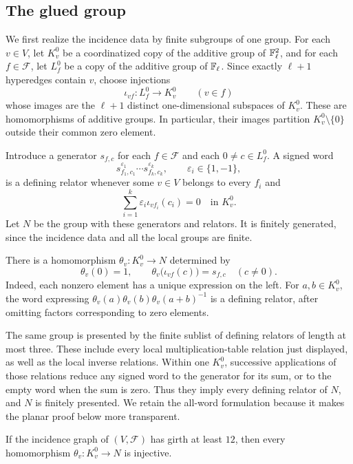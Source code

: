 \subsection{The glued group}

We first realize the incidence data by finite subgroups of one group.
For each $v\in V$, let $K_v^0$ be a coordinatized copy of the additive
group of $\mathbb F_\ell^2$, and for each $f\in\mathcal F$, let $L_f^0$ be a
copy of the additive group of $\mathbb F_\ell$.  Since exactly $\ell+1$
hyperedges contain $v$, choose injections
\[
  \iota_{vf}:L_f^0\longrightarrow K_v^0\qquad(v\in f)
\]
whose images are the $\ell+1$ distinct one-dimensional subspaces of
$K_v^0$.  These are homomorphisms of additive groups.  In particular,
their images partition $K_v^0\setminus\{0\}$ outside their common
zero element.

Introduce a generator $s_{f,c}$ for each $f\in\mathcal F$ and each
$0\ne c\in L_f^0$.  A signed word
\[
  s_{f_1,c_1}^{\varepsilon_1}\cdots
  s_{f_k,c_k}^{\varepsilon_k},\qquad \varepsilon_i\in\{1,-1\},
\]
is a defining relator whenever some $v\in V$ belongs to every $f_i$
and
\[
  \sum_{i=1}^k\varepsilon_i\iota_{vf_i}(c_i)=0
  \quad\text{in }K_v^0.
\]
Let $N$ be the group with these generators and relators.  It is
finitely generated, since the incidence data and all the local groups
are finite.

There is a homomorphism $\theta_v:K_v^0\to N$ determined by
\[
  \theta_v(0)=1,\qquad
  \theta_v\bigl(\iota_{vf}(c)\bigr)=s_{f,c}\quad(c\ne0).
\]
Indeed, each nonzero element has a unique expression on the left.
For $a,b\in K_v^0$, the word expressing
$\theta_v(a)\theta_v(b)\theta_v(a+b)^{-1}$ is a defining relator,
after omitting factors corresponding to zero elements.

The same group is presented by the finite sublist of defining relators
of length at most three. These include every local multiplication-table
relation just displayed, as well as the local inverse relations. Within
one $K_v^0$, successive applications of those relations reduce any
signed word to the generator for its sum, or to the empty word when
the sum is zero. Thus they imply every defining relator of $N$, and
$N$ is finitely presented.
We retain the all-word formulation because it makes the planar proof
below more transparent.

\begin{lemma}\label{lem:embedding}
If the incidence graph of $(V,\mathcal F)$ has girth at least $12$,
then every homomorphism $\theta_v:K_v^0\to N$ is injective.
\end{lemma}


